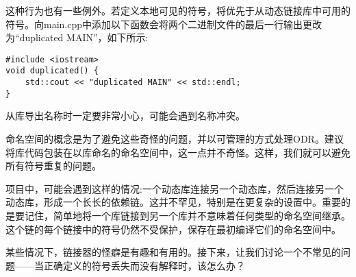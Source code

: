 这种行为也有一些例外。若定义本地可见的符号，将优先于从动态链接库中可用的符号。向main.cpp中添加以下函数会将两个二进制文件的最后一行输出更改为“duplicated MAIN”，如下所示:

\begin{lstlisting}[style=styleCXX]
#include <iostream>
void duplicated() {
	std::cout << "duplicated MAIN" << std::endl;
}
\end{lstlisting}

从库导出名称时一定要非常小心，可能会遇到名称冲突。


命名空间的概念是为了避免这些奇怪的问题，并以可管理的方式处理ODR。建议将库代码包装在以库命名的命名空间中，这一点并不奇怪。这样，我们就可以避免所有符号重复的问题。

项目中，可能会遇到这样的情况:一个动态库连接另一个动态库，然后连接另一个动态库，形成一个长长的依赖链。这并不罕见，特别是在更复杂的设置中。重要的是要记住，简单地将一个库链接到另一个库并不意味着任何类型的命名空间继承。这个链的每个链接中的符号仍然不受保护，保存在最初编译它们的命名空间中。

某些情况下，链接器的怪癖是有趣和有用的。接下来，让我们讨论一个不常见的问题——当正确定义的符号丢失而没有解释时，该怎么办？













